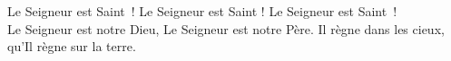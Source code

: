 Le Seigneur est Saint ! Le Seigneur est Saint ! Le Seigneur est Saint !\\
Le Seigneur est notre Dieu, Le Seigneur est notre Père. Il règne dans les cieux, qu’Il règne sur la terre.

